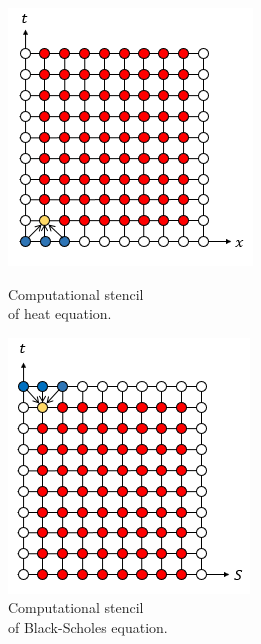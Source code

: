 \documentclass[12pt, oneside]{book}
\theoremstyle{plain}
\theoremstyle{definition}
\begin{document}
\begin{figure}[!htb]
\centering
  \begin{minipage}[b]{0.45\textwidth}
  \centering
    \includegraphics[width=\textwidth]{ExplicitHeat.png}
    \caption{Computational stencil \\of heat equation.}
  \end{minipage}
  \begin{minipage}[b]{0.45\textwidth}
  \centering
    \includegraphics[width=\textwidth]{ExplicitBS.png}
    \caption{Computational stencil \\of Black-Scholes equation.}
  \end{minipage}
\end{figure}
\end{document}
